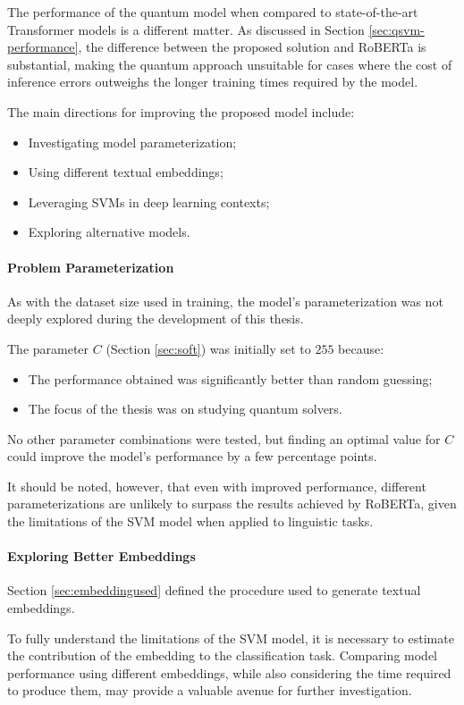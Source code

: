The performance of the quantum model when compared to state-of-the-art Transformer models is a different matter. As discussed in Section \ref{sec:qsvm-performance}, the difference between the proposed solution and RoBERTa is substantial, making the quantum approach unsuitable for cases where the cost of inference errors outweighs the longer training times required by the model.

The main directions for improving the proposed model include:
\begin{itemize}
    \item Investigating model parameterization;
    \item Using different textual embeddings;
    \item Leveraging SVMs in deep learning contexts;
    \item Exploring alternative models.
\end{itemize}

\paragraph{Problem Parameterization} As with the dataset size used in training, the model's parameterization was not deeply explored during the development of this thesis.

The parameter $C$ (Section \ref{sec:soft}) was initially set to $255$ because:
\begin{itemize}
    \item The performance obtained was significantly better than random guessing;
    \item The focus of the thesis was on studying quantum solvers.
\end{itemize}
No other parameter combinations were tested, but finding an optimal value for $C$ could improve the model’s performance by a few percentage points.

It should be noted, however, that even with improved performance, different parameterizations are unlikely to surpass the results achieved by RoBERTa, given the limitations of the SVM model when applied to linguistic tasks.

\paragraph{Exploring Better Embeddings} Section \ref{sec:embeddingused} defined the procedure used to generate textual embeddings.

To fully understand the limitations of the SVM model, it is necessary to estimate the contribution of the embedding to the classification task. Comparing model performance using different embeddings, while also considering the time required to produce them, may provide a valuable avenue for further investigation.

